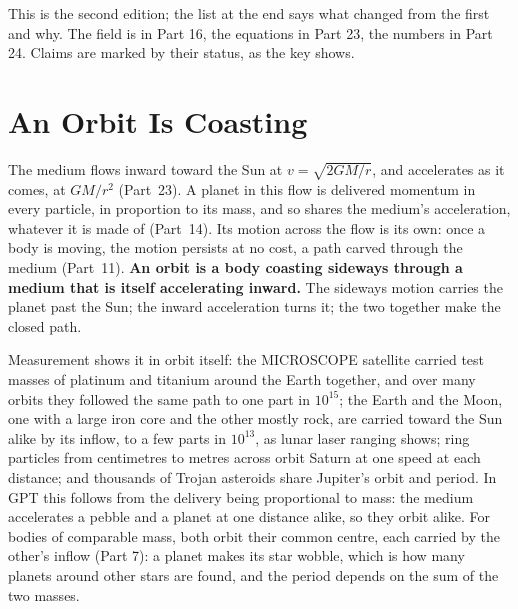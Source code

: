 \documentclass[11pt,a4paper]{article}
\begin{document}
This is the second edition; the list at the end says what changed from the first and why. The field is in Part 16, the equations in Part 23, the numbers in Part 24. Claims are marked by their status, as the key shows.

\statuskey

\section{An Orbit Is Coasting}
\label{sec:coasting}

\begin{hypbar}
The medium flows inward toward the Sun at $v=\sqrt{2GM/r}$, and accelerates as it comes, at $GM/r^2$ (Part~23). A planet in this flow is delivered momentum in every particle, in proportion to its mass, and so shares the medium's acceleration, whatever it is made of (Part~14).\footnotemark{} Its motion across the flow is its own: once a body is moving, the motion persists at no cost, a path carved through the medium (Part~11).\footnotemark{} \textbf{An orbit is a body coasting sideways through a medium that is itself accelerating inward.} The sideways motion carries the planet past the Sun; the inward acceleration turns it; the two together make the closed path.
\end{hypbar}
\addtocounter{footnote}{-1}

 Measurement shows it in orbit itself: the MICROSCOPE satellite carried test masses of platinum and titanium around the Earth together, and over many orbits they followed the same path to one part in $10^{15}$; the Earth and the Moon, one with a large iron core and the other mostly rock, are carried toward the Sun alike by its inflow, to a few parts in $10^{13}$, as lunar laser ranging shows; ring particles from centimetres to metres across orbit Saturn at one speed at each distance; and thousands of Trojan asteroids share Jupiter's orbit and period. In GPT this follows from the delivery being proportional to mass: the medium accelerates a pebble and a planet at one distance alike, so they orbit alike. For bodies of comparable mass, both orbit their common centre, each carried by the other's inflow (Part 7): a planet makes its star wobble, which is how many planets around other stars are found, and the period depends on the sum of the two masses.
\end{document}
